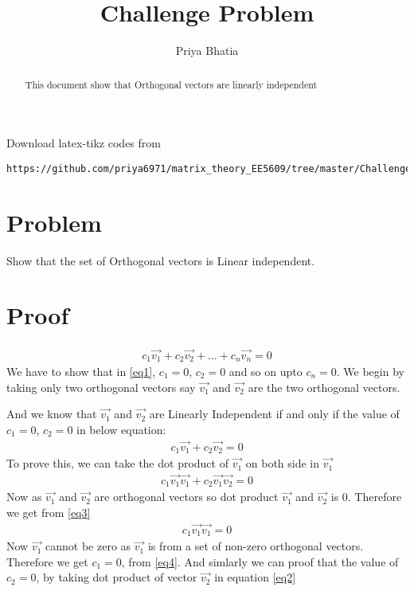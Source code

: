 \documentclass[journal,12pt,twocolumn]{IEEEtran}
\begin{document}
     \def\rightbox#1{\makebox[0in][r]{#1}}
     \def\centbox#1{\makebox[0in]{#1}}
     \def\topbox#1{\raisebox{-\baselineskip}[0in][0in]{#1}}
     \def\midbox#1{\raisebox{-0.5\baselineskip}[0in][0in]{#1}}
\vspace{3cm}
\title{Challenge Problem}
\author{Priya Bhatia}
\maketitle
\newpage
\bigskip
\renewcommand{\thefigure}{\theenumi}
\renewcommand{\thetable}{\theenumi}
\begin{abstract}
This document show that Orthogonal vectors are linearly independent
\end{abstract}
%
Download latex-tikz codes from
%
\begin{lstlisting}
https://github.com/priya6971/matrix_theory_EE5609/tree/master/ChallengeProblem
\end{lstlisting}
%
\section{Problem}
Show that the set of Orthogonal vectors is Linear independent. 
\section{Proof}
\begin{align}
c_1\vec{v_1}+c_2\vec{v_2}+\dots+c_n\vec{v_n}= 0\label{eq1}
\end{align}
We have to show that in \eqref{eq1}, $c_1=0$, $c_2=0$ and so on upto $c_n=0$.
We begin by taking only two orthogonal vectors say $\vec{v_1}$ and $\vec{v_2}$ are the two orthogonal vectors.

And we know that $\vec{v_1}$ and $\vec{v_2}$ are Linearly Independent if and only if the value of $c_1=0$, $c_2=0$ in below equation:
\begin{align}
c_1\vec{v_1}+c_2\vec{v_2} = 0\label{eq2}
\end{align}
To prove this, we can take the dot product of $\vec{v_1}$ on both side in $\vec{v_1}$
\begin{align}
c_1\vec{v_1}\vec{v_1}+c_2\vec{v_1}\vec{v_2} = 0\label{eq3}
\end{align}
Now as $\vec{v_1}$ and $\vec{v_2}$ are orthogonal vectors so dot product $\vec{v_1}$ and $\vec{v_2}$ is 0.
Therefore we get from \eqref{eq3}
\begin{align}
c_1\vec{v_1}\vec{v_1} = 0\label{eq4}
\end{align}
Now $\vec{v_1}$ cannot be zero as $\vec{v_1}$ is from a set of non-zero orthogonal vectors.
Therefore we get $c_1=0$, from \eqref{eq4}.
And simlarly we can proof that the value of $c_2=0$, by taking dot product of vector $\vec{v_2}$ in equation \eqref{eq2}
\end{document}
